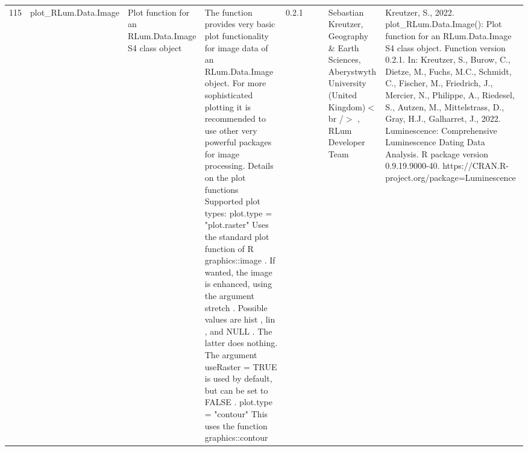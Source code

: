 \begin{table}[ht]
\begin{tabular}{rllllllll}
  115 & plot\_RLum.Data.Image & Plot function for an  RLum.Data.Image  S4 class object & The function provides very basic plot functionality for image data of an RLum.Data.Image  object. For more sophisticated plotting it is recommended to use other very powerful packages for image processing.  Details on the plot functions   Supported plot types:  plot.type = "plot.raster"   Uses the standard plot function of R  graphics::image . If wanted, the image is enhanced, using the argument  stretch . Possible values are  hist ,  lin , and NULL . The latter does nothing. The argument  useRaster = TRUE  is used by default, but can be set to  FALSE .  plot.type = "contour"   This uses the function  graphics::contour & 0.2.1
 &  &  & Sebastian Kreutzer, Geography \& Earth Sciences, Aberystwyth University (United Kingdom)$<$br /$>$ , RLum Developer Team & Kreutzer, S., 2022. plot\_RLum.Data.Image(): Plot function for an RLum.Data.Image S4 class object. Function version 0.2.1. In: Kreutzer, S., Burow, C., Dietze, M., Fuchs, M.C., Schmidt, C., Fischer, M., Friedrich, J., Mercier, N., Philippe, A., Riedesel, S., Autzen, M., Mittelstrass, D., Gray, H.J., Galharret, J., 2022. Luminescence: Comprehensive Luminescence Dating Data Analysis. R package version 0.9.19.9000-40. https://CRAN.R-project.org/package=Luminescence
 \\ 

\end{tabular}
\end{table}
